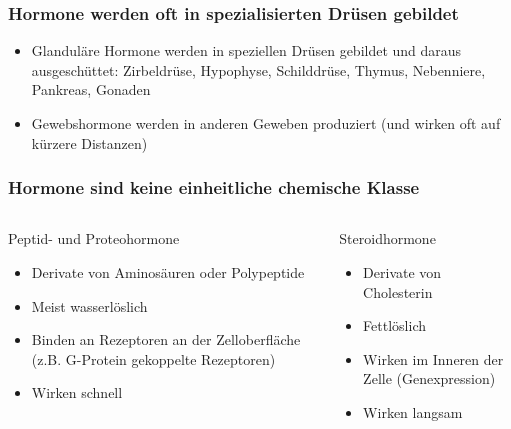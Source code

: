 \documentclass{beamer}
\begin{document}
\begin{frame}
\frametitle{Hormone werden oft in spezialisierten Drüsen gebildet}

\begin{itemize}
\item
Glanduläre Hormone werden in speziellen Drüsen gebildet und daraus ausgeschüttet: Zirbeldrüse, Hypophyse, Schilddrüse, Thymus, Nebenniere, Pankreas, Gonaden
\item
Gewebshormone werden in anderen Geweben produziert (und wirken oft auf kürzere Distanzen) 
\end{itemize}


\end{frame}


\begin{frame}
\frametitle{Hormone sind keine einheitliche chemische Klasse}

\begin{columns}[t]

\begin{column}{5cm}
\begin{block}{Peptid- und Proteohormone}

\begin{itemize}
\item
Derivate von Aminosäuren oder Polypeptide
\item
Meist wasserlöslich
\item
Binden an Rezeptoren an der Zelloberfläche (z.B. G-Protein gekoppelte Rezeptoren)
\item
Wirken schnell
\end{itemize}
\end{block}

\end{column}

\begin{column}{5cm}

\begin{block}{Steroidhormone}

\begin{itemize}
\item
Derivate von Cholesterin
\item
Fettlöslich
\item
Wirken im Inneren der Zelle (Genexpression)
\item
Wirken langsam
\end{itemize}
\end{block}

\end{column}


\end{columns}



\end{frame}
\end{document}
